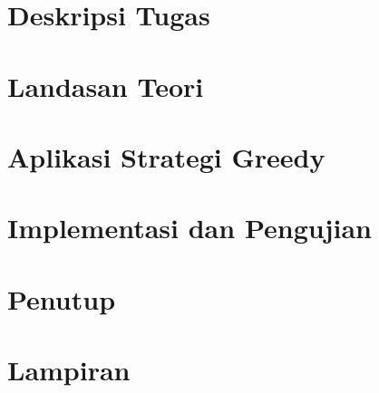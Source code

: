 \documentclass[12pt,a4paper]{report}
\begin{document}
\chapter{Deskripsi Tugas}


\chapter{Landasan Teori}


\chapter{Aplikasi Strategi Greedy}


\chapter{Implementasi dan Pengujian}


\chapter{Penutup}


\chapter{Lampiran}



\end{document}
